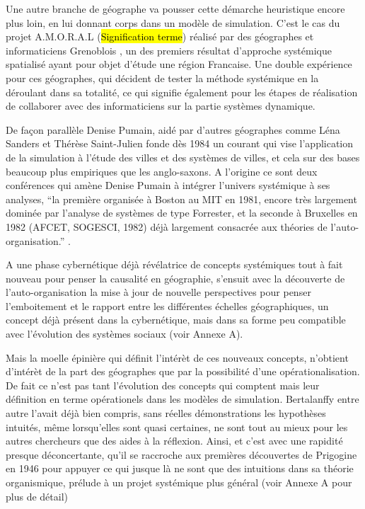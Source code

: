 Une autre branche de géographe va pousser cette démarche heuristique encore plus loin, en lui donnant corps dans un modèle de simulation. C'est le cas du projet A.M.O.R.A.L (\hl{Signification terme}) réalisé par des géographes et informaticiens Grenoblois \autocite{1984}, un des premiers résultat d'approche systémique spatialisé ayant pour objet d'étude une région Francaise. Une double expérience pour ces géographes, qui décident de tester la méthode systémique en la déroulant dans sa totalité, ce qui signifie également pour les étapes de réalisation de collaborer avec des informaticiens sur la partie systèmes dynamique. \autocite{Guermond84, LeBerre1987}

De façon parallèle Denise Pumain, aidé par d'autres géographes comme Léna Sanders et Thérèse Saint-Julien fonde dès 1984 \autocite{Pumain1984} un courant qui vise l'application de la simulation à l'étude des villes et des systèmes de villes, et cela sur des bases beaucoup plus empiriques que les anglo-saxons. A l'origine ce sont deux conférences qui amène Denise Pumain à intégrer l'univers systémique à ses analyses, \enquote{la première organisée à Boston au MIT en 1981, encore très largement dominée par l’analyse de systèmes de type Forrester, et la seconde à Bruxelles en 1982 (AFCET, SOGESCI, 1982) déjà largement consacrée aux théories de l’auto-organisation.}\textcite[27]{Pumain2003} \autocite[27]{Pumain2003}.

A une phase cybernétique déjà révélatrice de concepts systémiques tout à fait nouveau pour penser la causalité en géographie, s'ensuit avec la découverte de l'auto-organisation la mise à jour de nouvelle perspectives pour penser l'emboitement et le rapport entre les différentes échelles géographiques, un concept déjà présent dans la cybernétique, mais dans sa forme peu compatible avec l'évolution des systèmes sociaux (voir Annexe A).

Mais la moelle épinière qui définit l'intérèt de ces nouveaux concepts, n'obtient d'intérèt de la part des géographes que par la possibilité d'une opérationalisation. De fait ce n'est pas tant l'évolution des concepts qui comptent mais leur définition en terme opérationels dans les modèles de simulation. Bertalanffy entre autre l'avait déjà bien compris, sans réelles démonstrations les hypothèses intuités, même lorsqu'elles sont quasi certaines, ne sont tout au mieux pour les autres chercheurs que des aides à la réflexion. Ainsi, et c'est avec une rapidité presque déconcertante, qu'il se raccroche aux premières découvertes de Prigogine en 1946 pour appuyer ce qui jusque là ne sont que des intuitions dans sa théorie organismique, prélude à un projet systémique plus général (voir Annexe A pour plus de détail)

